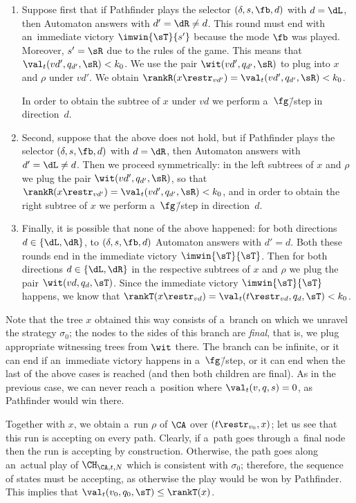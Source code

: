 \documentclass{lmcs}
\numberwithin{equation}{section}
\numberwithin{figure}{section}
\begin{document}
\begin{enumerate}
\item	Suppose first that if Pathfinder plays the selector $(\delta,s,\fb,d)$ with $d=\dL$, then Automaton answers with $d'=\dR\neq d$.
	This round must end with an~immediate victory $\imwin{\sT}{s'}$ because the mode $\fb$ was played.
	Moreover, $s'=\sR$ due to the rules of the game.
	This means that $\val_t(vd',q_{d'},\sR)<k_0$.
	We use the pair $\wit(vd',q_{d'},\sR)$ to plug into $x$ and $\rho$ under $vd'$.
	We obtain $\rankR(x\restr_{vd'})=\val_t(vd',q_{d'},\sR)<k_0$.

	In order to obtain the subtree of $x$ under $vd$ we perform a~$\fg$\=/step in direction~$d$.

\item	Second, suppose that the above does not hold, but if Pathfinder plays the selector $(\delta,s,\fb,d)$ with $d=\dR$, then Automaton answers with $d'=\dL\neq d$.
	Then we proceed symmetrically: in the left subtrees of $x$ and $\rho$ we plug the pair $\wit(vd',q_{d'},\sR)$, so that $\rankR(x\restr_{vd'})=\val_t(vd',q_{d'},\sR)<k_0$,
	and in order to obtain the right subtree of $x$ we perform a~$\fg$\=/step in direction~$d$.

\item	Finally, it is possible that none of the above happened: for both directions $d\in\{\dL,\dR\}$, to $(\delta,s,\fb,d)$ Automaton answers with $d'=d$.
	Both these rounds end in the immediate victory $\imwin{\sT}{\sT}$.
	Then for both directions $d\in\{\dL,\dR\}$ in the respective subtrees of $x$ and $\rho$ we plug the pair $\wit(vd,q_d,\sT)$.
	Since the immediate victory $\imwin{\sT}{\sT}$ happens, we know that $\rankT(x\restr_{vd})=\val_t(t\restr_{vd},q_d,\sT)< k_0$.
\end{enumerate}
\noindent %
Note that the tree $x$ obtained this way consists of a~branch on which we unravel the strategy $\sigma_0$;
the nodes to the sides of this branch are \emph{final}, that is, we plug appropriate witnessing trees from $\wit$ there.
The branch can be infinite, or it can end if an~immediate victory happens in a~$\fg$\=/step, or it can end when the last of the above cases is reached (and then both children are final).
As in the previous case, we can never reach a~position where $\val_t(v,q,s)=0$, as Pathfinder would win there.

Together with $x$, we obtain a~run $\rho$ of $\CA$ over $(t\restr_{v_0},x)$; let us see that this run is accepting on every path.
Clearly, if a~path goes through a~final node then the run is accepting by construction.
Otherwise, the path goes along an~actual play of $\CH_{\CA,t,N}$ which is consistent with $\sigma_0$;
therefore, the sequence of states must be accepting, as otherwise the play would be won by Pathfinder.
This implies that $\val_t(v_0,q_0,\sT)\leq\rankT(x)$.
\end{document}
